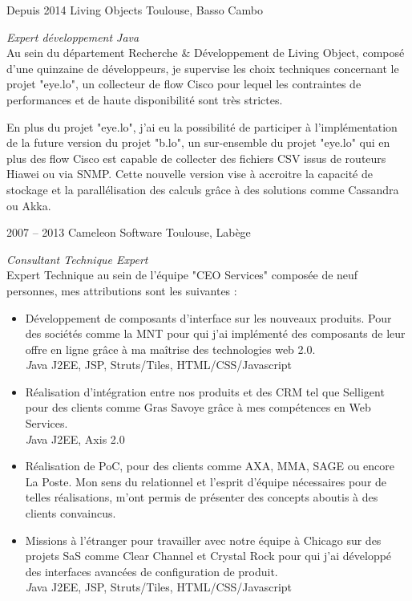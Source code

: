 \documentclass{friggeri-cv} 	%
\begin{document}
\begin{entrylist}
\entry
{Depuis 2014}
{Living Objects}
{Toulouse, Basso Cambo}
{\emph{Expert développement Java} \\
Au sein du département Recherche \& Développement de Living Object, composé d'une quinzaine de développeurs, je supervise les choix techniques concernant le projet "eye.lo", un collecteur de flow Cisco pour lequel les contraintes de performances et de haute disponibilité sont très strictes.

En plus du projet "eye.lo", j'ai eu la possibilité de participer à l'implémentation de la future version du projet "b.lo", un sur-ensemble du projet "eye.lo" qui en plus des flow Cisco est capable de collecter des fichiers CSV issus de routeurs Hiawei ou via SNMP. Cette nouvelle version vise à accroitre la capacité de stockage et la parallélisation des calculs grâce à des solutions comme Cassandra ou Akka.
}
\entry
{2007 -- 2013}
{Cameleon Software}
{Toulouse, Labège}
{\emph{Consultant Technique Expert} \\
Expert Technique au sein de l'équipe "CEO Services" composée de neuf personnes, mes attributions sont les suivantes :
\begin{itemize}
\item Développement de composants d’interface sur les nouveaux produits. Pour des sociétés
comme la MNT pour qui j’ai implémenté des composants de leur offre en ligne grâce à ma
maîtrise des technologies web 2.0. \\
	{\footnotesize \textit Java J2EE, JSP, Struts/Tiles, HTML/CSS/Javascript}
\item Réalisation d’intégration entre nos produits et des CRM tel que Selligent pour des clients
comme Gras Savoye grâce à mes compétences en Web Services. \\
	{\footnotesize \textit Java J2EE, Axis 2.0}
\item Réalisation de PoC, pour des clients comme AXA, MMA, SAGE ou encore La Poste. Mon sens
du relationnel et l'esprit d'équipe nécessaires pour de telles réalisations, m'ont permis de
présenter des concepts aboutis à des clients convaincus.
\item Missions à l’étranger pour travailler avec notre équipe à Chicago sur des projets SaS comme
Clear Channel et Crystal Rock pour qui j'ai développé des interfaces avancées de
configuration de produit. \\
{\footnotesize \textit Java J2EE, JSP, Struts/Tiles, HTML/CSS/Javascript}

\end{itemize}}
\end{entrylist}
\end{document}
